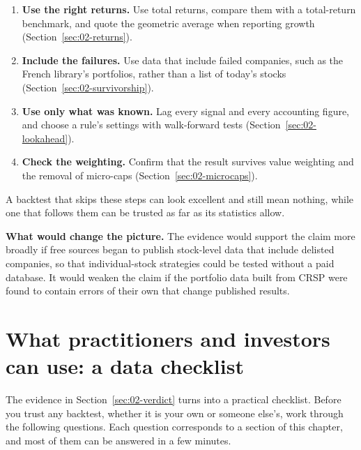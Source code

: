 \begin{enumerate}
  \item \textbf{Use the right returns.} Use total returns, compare them with a total-return benchmark, and quote the geometric average when reporting growth (Section~\ref{sec:02-returns}).
  \item \textbf{Include the failures.} Use data that include failed companies, such as the French library's portfolios, rather than a list of today's stocks (Section~\ref{sec:02-survivorship}).
  \item \textbf{Use only what was known.} Lag every signal and every accounting figure, and choose a rule's settings with walk-forward tests (Section~\ref{sec:02-lookahead}).
  \item \textbf{Check the weighting.} Confirm that the result survives value weighting and the removal of micro-caps (Section~\ref{sec:02-microcaps}).
\end{enumerate}

A backtest that skips these steps can look excellent and still mean nothing, while one that follows them can be trusted as far as its statistics allow.

\textbf{What would change the picture.} The evidence would support the claim more broadly if free sources began to publish stock-level data that include delisted companies, so that individual-stock strategies could be tested without a paid database. It would weaken the claim if the portfolio data built from CRSP were found to contain errors of their own that change published results.

\section{What practitioners and investors can use: a data checklist}
\label{sec:02-checklist}

The evidence in Section~\ref{sec:02-verdict} turns into a practical checklist. Before you trust any backtest, whether it is your own or someone else's, work through the following questions. Each question corresponds to a section of this chapter, and most of them can be answered in a few minutes.

